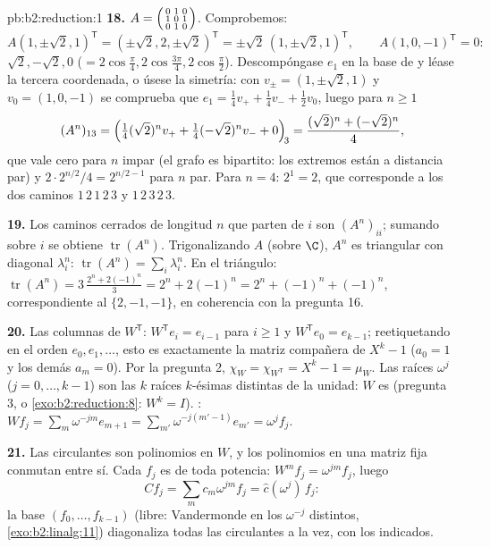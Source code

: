 \begin{solution}{pb:b2:reduction:1}
\textbf{18.} $A = \begin{psmallmatrix} 0&1&0\\ 1&0&1\\
0&1&0\end{psmallmatrix}$. Comprobemos:
\[
A(1, \pm\sqrt2, 1)^{\mathsf T}
= (\pm\sqrt2, 2, \pm\sqrt2)^{\mathsf T}
= \pm\sqrt2\,(1, \pm\sqrt2, 1)^{\mathsf T},
\qquad
A(1, 0, -1)^{\mathsf T} = 0 :
\]
 $\sqrt2, -\sqrt2, 0$ ($= 2\cos\frac\pi4,
2\cos\frac{3\pi}4, 2\cos\frac\pi2$). Descompóngase $e_1$ en la
base de  y léase la tercera coordenada, o úsese la
simetría: con $v_\pm = (1, \pm\sqrt2, 1)$ y $v_0 = (1, 0, -1)$ se
comprueba que $e_1 = \frac14 v_+ + \frac14 v_- + \frac12 v_0$,
luego para $n \geq 1$
\[
(A^n)_{13} = \Bigl(\tfrac14(\sqrt2)^n v_+ +
\tfrac14(-\sqrt2)^n v_- + 0\Bigr)_{\!3}
= \frac{(\sqrt2)^n + (-\sqrt2)^n}{4},
\]
que vale cero para $n$ impar (el grafo es bipartito: los extremos
están a distancia par) y $2\cdot 2^{n/2}/4 = 2^{n/2 - 1}$ para $n$
par. Para $n = 4$: $2^{1} = 2$, que corresponde a los dos caminos
$1\,2\,1\,2\,3$ y $1\,2\,3\,2\,3$.

\textbf{19.} Los caminos cerrados de longitud $n$ que parten de
$i$ son $(A^n)_{ii}$; sumando sobre $i$ se obtiene
$\operatorname{tr}(A^n)$. Trigonalizando $A$ (sobre $\C$), $A^n$
es triangular con diagonal $\lambda_i^n$: $\operatorname{tr}(A^n)
= \sum_i\lambda_i^n$. En el triángulo: $\operatorname{tr}(A^n) =
3\,\frac{2^n + 2(-1)^n}3 = 2^n + 2(-1)^n = 2^n + (-1)^n +
(-1)^n$, correspondiente al  $\{2, -1, -1\}$, en
coherencia con la pregunta 16.

\textbf{20.} Las columnas de $W^{\mathsf T}$: $W^{\mathsf T}e_i =
e_{i-1}$ para $i \geq 1$ y $W^{\mathsf T}e_0 = e_{k-1}$;
reetiquetando en el orden $e_0, e_1, \dots$, esto es exactamente
la matriz compañera de $X^k - 1$ ($a_0 = 1$ y los demás $a_m =
0$). Por la pregunta 2, $\chi_{W} = \chi_{W^{\mathsf T}} = X^k - 1
= \mu_{W}$. Las raíces $\omega^j$ ($j = 0, \dots, k-1$) son las
$k$ raíces $k$-ésimas distintas de la unidad: $W$ es
 (pregunta 3, o \cref{exo:b2:reduction:8}: $W^k =
I$). : $Wf_j = \sum_m \omega^{-jm}e_{m+1} =
\sum_{m'}\omega^{-j(m'-1)}e_{m'} = \omega^j f_j$.

\textbf{21.} Las circulantes son polinomios en $W$, y los
polinomios en una matriz fija conmutan entre sí. Cada $f_j$ es
 de toda potencia: $W^m f_j = \omega^{jm}f_j$, luego
\[
Cf_j = \sum_m c_m\omega^{jm} f_j = \widehat c(\omega^j)\,f_j :
\]
la base $(f_0, \dots, f_{k-1})$ (libre: Vandermonde en los
$\omega^{-j}$ distintos, \cref{exo:b2:linalg:11}) diagonaliza
todas las circulantes a la vez, con los 
indicados.


\end{solution}
